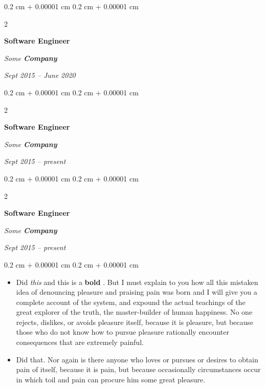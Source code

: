 \documentclass[10pt, letterpaper]{article}
\newenvironment{highlights}{
    \begin{itemize}[
        topsep=0.10 cm,
        parsep=0.10 cm,
        partopsep=0pt,
        itemsep=0pt,
        leftmargin=0.4 cm + 10pt
    ]
}{
    \end{itemize}
} %
\newenvironment{onecolentry}{
    \begin{adjustwidth}{
        0.2 cm + 0.00001 cm
    }{
        0.2 cm + 0.00001 cm
    }
}{
    \end{adjustwidth}
} %
\newenvironment{twocolentry}[2][]{
    \onecolentry
    \def\secondColumn{#2}
    \setcolumnwidth{\fill, 4.5 cm}
    \begin{paracol}{2}
}{
    \switchcolumn \raggedleft \secondColumn
    \end{paracol}
    \endonecolentry
} %
\let\hrefWithoutArrow\href
\renewcommand{\href}[2]{\hrefWithoutArrow{#1}{\ifthenelse{\equal{#2}{}}{ }{#2 }\raisebox{.15ex}{\footnotesize \faExternalLink*}}}
\begin{document}
        \vspace{0.2 cm}

        \begin{twocolentry}{
            
            
        \textit{Sept 2015 – June 2020}}
            \textbf{Software Engineer}
            
            \textit{Some \textbf{Company}}
        \end{twocolentry}



        \vspace{0.2 cm}

        \begin{twocolentry}{
            
            
        \textit{Sept 2015 – present}}
            \textbf{Software Engineer}
            
            \textit{Some \textbf{Company}}
        \end{twocolentry}



        \vspace{0.2 cm}

        \begin{twocolentry}{
            
            
        \textit{Sept 2015 – present}}
            \textbf{Software Engineer}
            
            \textit{Some \textbf{Company}}
        \end{twocolentry}

        \vspace{0.10 cm}
        \begin{onecolentry}
            \begin{highlights}
                \item Did \textit{this} and this is a \textbf{bold} \href{https://example.com}{link}. But I must explain to you how all this mistaken idea of denouncing pleasure and praising pain was born and I will give you a complete account of the system, and expound the actual teachings of the great explorer of the truth, the master-builder of human happiness. No one rejects, dislikes, or avoids pleasure itself, because it is pleasure, but because those who do not know how to pursue pleasure rationally encounter consequences that are extremely painful.
                \item Did that. Nor again is there anyone who loves or pursues or desires to obtain pain of itself, because it is pain, but because occasionally circumstances occur in which toil and pain can procure him some great pleasure.
            \end{highlights}
        \end{onecolentry}
\end{document}
